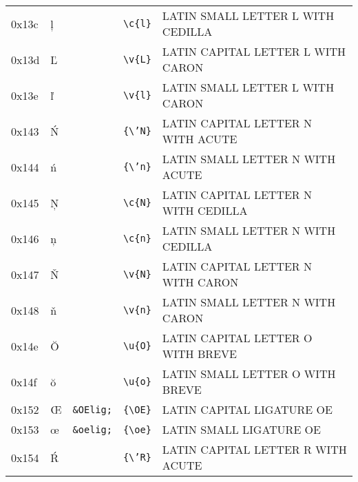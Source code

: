 \documentclass[a4paper,10pt]{article}
\begin{document}
{\begin{center}
\begin{xtabular}{llllp{10cm}}
0x13c  & \c{l}                  & \texttt{}           & \texttt{{\textbackslash}c\{l\}}                        & LATIN SMALL LETTER L WITH CEDILLA          \\
0x13d  & \v{L}                  & \texttt{}           & \texttt{{\textbackslash}v\{L\}}                        & LATIN CAPITAL LETTER L WITH CARON          \\
0x13e  & \v{l}                  & \texttt{}           & \texttt{{\textbackslash}v\{l\}}                        & LATIN SMALL LETTER L WITH CARON            \\
0x143  & {\'N}                  & \texttt{}           & \texttt{\{{\textbackslash}'N\}}                        & LATIN CAPITAL LETTER N WITH ACUTE          \\
0x144  & {\'n}                  & \texttt{}           & \texttt{\{{\textbackslash}'n\}}                        & LATIN SMALL LETTER N WITH ACUTE            \\
0x145  & \c{N}                  & \texttt{}           & \texttt{{\textbackslash}c\{N\}}                        & LATIN CAPITAL LETTER N WITH CEDILLA        \\
0x146  & \c{n}                  & \texttt{}           & \texttt{{\textbackslash}c\{n\}}                        & LATIN SMALL LETTER N WITH CEDILLA          \\
0x147  & \v{N}                  & \texttt{}           & \texttt{{\textbackslash}v\{N\}}                        & LATIN CAPITAL LETTER N WITH CARON          \\
0x148  & \v{n}                  & \texttt{}           & \texttt{{\textbackslash}v\{n\}}                        & LATIN SMALL LETTER N WITH CARON            \\
0x14e  & \u{O}                  & \texttt{}           & \texttt{{\textbackslash}u\{O\}}                        & LATIN CAPITAL LETTER O WITH BREVE          \\
0x14f  & \u{o}                  & \texttt{}           & \texttt{{\textbackslash}u\{o\}}                        & LATIN SMALL LETTER O WITH BREVE            \\
0x152  & {\OE}                  & \texttt{\&OElig;}   & \texttt{\{{\textbackslash}OE\}}                        & LATIN CAPITAL LIGATURE OE                  \\
0x153  & {\oe}                  & \texttt{\&oelig;}   & \texttt{\{{\textbackslash}oe\}}                        & LATIN SMALL LIGATURE OE                    \\
0x154  & {\'R}                  & \texttt{}           & \texttt{\{{\textbackslash}'R\}}                        & LATIN CAPITAL LETTER R WITH ACUTE          \\

\end{xtabular}
\end{center}}
\end{document}
